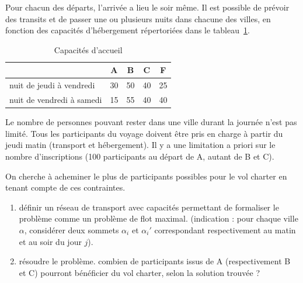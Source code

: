 \documentclass[paper=a4, fontsize=11pt]{scrartcl} %
\numberwithin{equation}{section} %
\numberwithin{figure}{section} %
\numberwithin{table}{section} %
\begin{document}
Pour chacun des départs, l'arrivée a lieu le soir même. Il est
possible de prévoir des transits et de passer une ou plusieurs nuits
dans chacune des villes, en fonction des capacités d'hébergement
répertoriées dans le tableau~\ref{tab:nuit}.

\begin{table}[htbp]
  \begin{center}
    \begin{tabular}{|l|cccc|}
      \hline
      & A & B & C & F \\
      \hline
      nuit de jeudi à vendredi & 30 & 50 & 40 & 25 \\
      nuit de vendredi à samedi & 15 & 55 & 40 & 40 \\
      \hline
    \end{tabular}
    \caption{Capacités d'accueil}
    \label{tab:nuit}
  \end{center}
\end{table}

Le nombre de personnes pouvant rester dans une ville durant la journée
n'est pas limité. Tous les participants du voyage doivent être pris en
charge à partir du jeudi matin (transport et hébergement). Il y a une
limitation a priori sur le nombre d'inscriptions (100 participants au
départ de A, autant de B et C). 

On cherche à acheminer le plus de participants possibles pour le vol
charter en tenant compte de ces contraintes.

\begin{enumerate}
\item définir un réseau de transport avec capacités permettant de
   formaliser le problème comme un problème de flot
   maximal. (indication : pour chaque ville $\alpha$, considérer deux
   sommets $\alpha_i$ et $\alpha_i'$ correspondant respectivement au
   matin et au soir du jour $j$).

\item résoudre le problème. combien de participants issus de A
   (respectivement B et C) pourront bénéficier du vol charter, selon
   la solution trouvée ?
\end{enumerate}
\end{document}
